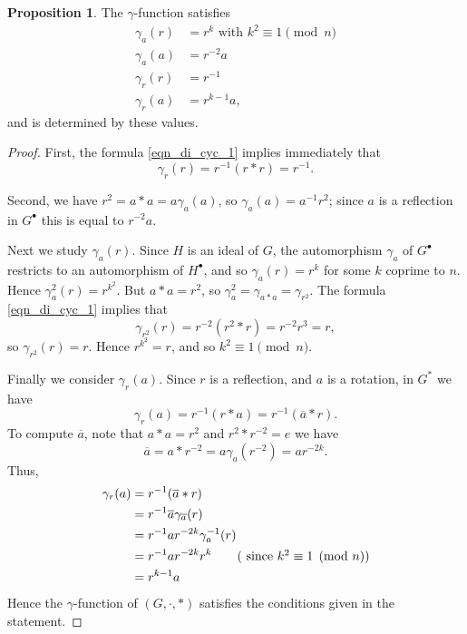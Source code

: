 \documentclass[reqno]{amsart}
\theoremstyle{definition}
\newtheorem{proposition}[theorem]{Proposition}
\renewcommand{\bar}{\overline}
\begin{document}
\begin{proposition} \label{prop_di_cyc_necessary}
The $ \gamma $-function satisfies
\begin{align*}
\gamma_{a}(r) &= r^{k} \mbox{ with } k^{2} \equiv 1 \pmod{n} \\
\gamma_{a}(a) &= r^{-2}a \\
\gamma_{r}(r) &= r^{-1} \\
\gamma_{r}(a) &= r^{k-1}a,
\end{align*}
and is determined by these values. 
\end{proposition}
\begin{proof}
First, the formula \eqref{eqn_di_cyc_1} implies immediately that 
\[ \gamma_{r}(r) = r^{-1}(r \ast r) = r^{-1}. \]

Second, we have $ r^{2} = a \ast a = a \gamma_{a}(a) $, so $ \gamma_{a}(a) = a^{-1}r^{2} $; since $ a $ is a reflection in $ G^{\bullet} $ this is equal to $ r^{-2} a $. 

Next we study $ \gamma_{a}(r) $. Since $ H $ is an ideal of $ G $, the automorphism $ \gamma_{a} $ of $ G^{\bullet} $ restricts to an automorphism of $ H^{\bullet} $, and so $ \gamma_{a}(r) = r^{k} $ for some $ k $ coprime to $ n $. Hence $ \gamma_{a}^{2}(r) = r^{k^{2}} $. But $ a \ast a = r^{2} $, so $ \gamma_{a}^{2} = \gamma_{a \ast a} = \gamma_{r^{2}} $. The formula \eqref{eqn_di_cyc_1} implies that 
\[ \gamma_{r^{2}}(r) = r^{-2}(r^{2} \ast r) = r^{-2}r^{3} = r, \] 
so $\gamma_{r^{2}}(r) = r $. Hence $ r^{k^{2}} = r $, and so $ k^{2} \equiv 1 \pmod{n} $. 

Finally we consider $ \gamma_{r}(a) $. Since $ r $ is a reflection, and $ a $ is a rotation, in $ G^{\ast} $ we have
\[ \gamma_{r}(a) = r^{-1}(r \ast a) = r^{-1}(\bar{a} \ast r). \]
To compute $ \bar{a} $, note that $ a \ast a = r^{2} $ and $ r^{2} \ast r^{-2} = e $ we have
\[ \bar{a} = a \ast r^{-2} = a \gamma_{a}(r^{-2}) = ar^{-2k}. \]
Thus,
\begin{align*}
\gamma_{r}(a) &= r^{-1}(\bar{a} \ast r) \\
&= r^{-1} \bar{a} \gamma_{\bar{a}}(r) \\
&= r^{-1} ar^{-2k} \gamma_{a}^{-1}(r) \\
&= r^{-1} ar^{-2k} r^{k} \tag{ since $ k^{2} \equiv 1 \pmod{n} $} \\
&= r^{k-1} a
\end{align*}
Hence the $ \gamma $-function of $ (G,\cdot,\ast) $ satisfies the conditions given in the statement. 
\end{proof}
\end{document}
